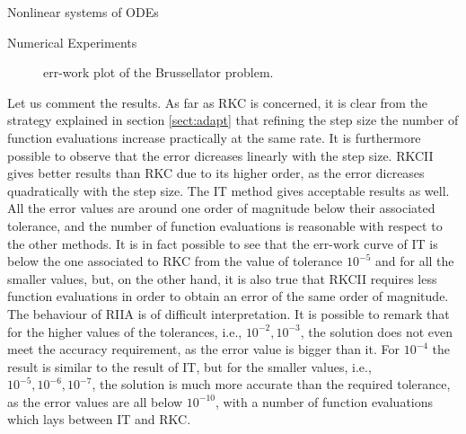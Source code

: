 \documentclass{article}
\begin{document}
\begin{section}{Nonlinear systems of ODEs}
\begin{subsection}{Numerical Experiments}
\begin{figure}[t!]
\caption{err-work plot of the Brussellator problem.}
\label{fig:BRUSSres}
\end{figure}
Let us comment the results. As far as RKC is concerned, it is clear from the strategy explained in section \ref{sect:adapt} that refining the step size the number of function evaluations increase practically at the same rate. It is furthermore possible to observe that the error dicreases linearly with the step size. RKCII gives better results than RKC due to its higher order, as the error dicreases quadratically with the step size. The IT method gives acceptable results as well. All the error values are around one order of magnitude below their associated tolerance, and the number of function evaluations is reasonable with respect to the other methods. It is in fact possible to see that the err-work curve of IT is below the one associated to RKC from the value of tolerance $10^{-5}$ and for all the smaller values, but, on the other hand, it is also true that RKCII requires less function evaluations in order to obtain an error of the same order of magnitude. The behaviour of RIIA is of difficult interpretation. It is possible to remark that for the higher values of the tolerances, i.e., $10^{-2},10^{-3}$, the solution does not even meet the accuracy requirement, as the error value is bigger than it. For $10^{-4}$ the result is similar to the result of IT, but for the smaller values, i.e., $10^{-5},10^{-6},10^{-7}$, the solution is much more accurate than the required tolerance, as the error values are all below $10^{-10}$, with a number of function evaluations which lays between IT and RKC.\\


\end{subsection}
\end{section}
\end{document}
